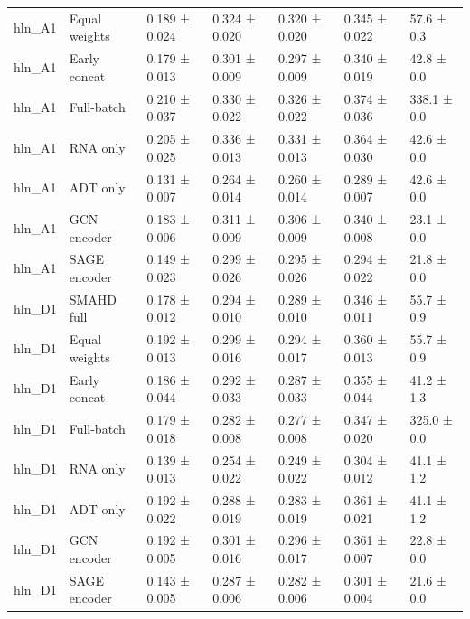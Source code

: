 \begin{tabular}{lllllll}
hln\_A1 & Equal weights & 0.189 ± 0.024 & 0.324 ± 0.020 & 0.320 ± 0.020 & 0.345 ± 0.022 & 57.6 ± 0.3 \\
hln\_A1 & Early concat & 0.179 ± 0.013 & 0.301 ± 0.009 & 0.297 ± 0.009 & 0.340 ± 0.019 & 42.8 ± 0.0 \\
hln\_A1 & Full-batch & 0.210 ± 0.037 & 0.330 ± 0.022 & 0.326 ± 0.022 & 0.374 ± 0.036 & 338.1 ± 0.0 \\
hln\_A1 & RNA only & 0.205 ± 0.025 & 0.336 ± 0.013 & 0.331 ± 0.013 & 0.364 ± 0.030 & 42.6 ± 0.0 \\
hln\_A1 & ADT only & 0.131 ± 0.007 & 0.264 ± 0.014 & 0.260 ± 0.014 & 0.289 ± 0.007 & 42.6 ± 0.0 \\
hln\_A1 & GCN encoder & 0.183 ± 0.006 & 0.311 ± 0.009 & 0.306 ± 0.009 & 0.340 ± 0.008 & 23.1 ± 0.0 \\
hln\_A1 & SAGE encoder & 0.149 ± 0.023 & 0.299 ± 0.026 & 0.295 ± 0.026 & 0.294 ± 0.022 & 21.8 ± 0.0 \\
hln\_D1 & SMAHD full & 0.178 ± 0.012 & 0.294 ± 0.010 & 0.289 ± 0.010 & 0.346 ± 0.011 & 55.7 ± 0.9 \\
hln\_D1 & Equal weights & 0.192 ± 0.013 & 0.299 ± 0.016 & 0.294 ± 0.017 & 0.360 ± 0.013 & 55.7 ± 0.9 \\
hln\_D1 & Early concat & 0.186 ± 0.044 & 0.292 ± 0.033 & 0.287 ± 0.033 & 0.355 ± 0.044 & 41.2 ± 1.3 \\
hln\_D1 & Full-batch & 0.179 ± 0.018 & 0.282 ± 0.008 & 0.277 ± 0.008 & 0.347 ± 0.020 & 325.0 ± 0.0 \\
hln\_D1 & RNA only & 0.139 ± 0.013 & 0.254 ± 0.022 & 0.249 ± 0.022 & 0.304 ± 0.012 & 41.1 ± 1.2 \\
hln\_D1 & ADT only & 0.192 ± 0.022 & 0.288 ± 0.019 & 0.283 ± 0.019 & 0.361 ± 0.021 & 41.1 ± 1.2 \\
hln\_D1 & GCN encoder & 0.192 ± 0.005 & 0.301 ± 0.016 & 0.296 ± 0.017 & 0.361 ± 0.007 & 22.8 ± 0.0 \\
hln\_D1 & SAGE encoder & 0.143 ± 0.005 & 0.287 ± 0.006 & 0.282 ± 0.006 & 0.301 ± 0.004 & 21.6 ± 0.0 \\
\bottomrule
\end{tabular}
